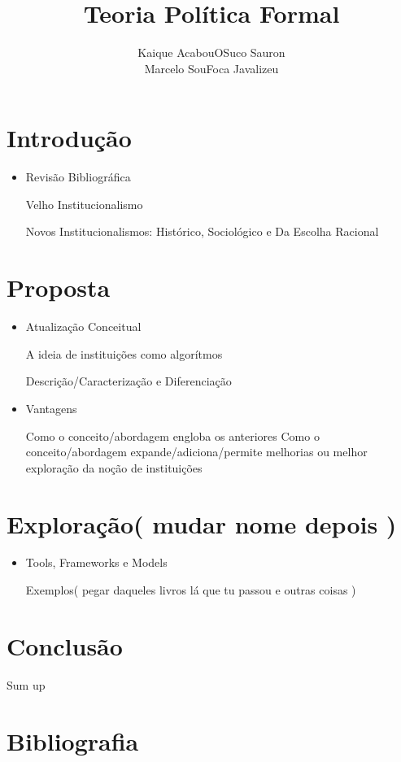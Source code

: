 \documentclass{article}
\title{ Teoria Política Formal}
\author{ Kaique AcabouOSuco Sauron \\ Marcelo SouFoca Javalizeu }
\date{}
\begin{document}
\maketitle

\newpage

\section{ Introdução }

\begin{itemize}

\item Revisão Bibliográfica

    \subitem Velho Institucionalismo
    
    \subitem Novos Institucionalismos: Histórico, Sociológico e Da Escolha Racional

\end{itemize}

\section{ Proposta }

\begin{itemize}

\item Atualização Conceitual

    \subitem A ideia de instituições como algorítmos
    
        \subsubitem Descrição/Caracterização e Diferenciação
        
\item Vantagens

    \subitem Como o conceito/abordagem engloba os anteriores
    \subitem Como o conceito/abordagem expande/adiciona/permite melhorias ou melhor exploração da noção de instituições

\end{itemize}

\section{ Exploração( mudar nome depois ) }

\begin{itemize}

\item Tools, Frameworks e Models

    \subitem Exemplos( pegar daqueles livros lá que tu passou e outras coisas )

\end{itemize}

\section{ Conclusão }

Sum up

\newpage

\section*{ Bibliografia }
\end{document}
